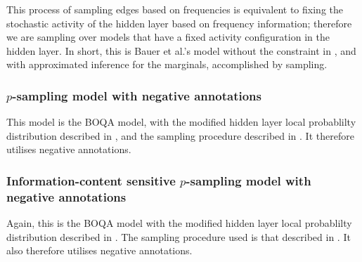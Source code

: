 This process of sampling edges based on frequencies is equivalent to
fixing the stochastic activity of the hidden layer based on
frequency information;
%
therefore we are sampling over models that have a fixed activity configuration in the
hidden layer.
%
In short, this is Bauer et al.'s model without the constraint in
, and with approximated inference for the
marginals, accomplished by sampling.

\subsubsection{$p$-sampling model with negative annotations}
\label{subsubsec:psampexp}
%
This model is the BOQA model, with the modified hidden layer local probablilty
distribution described in , and the sampling
procedure described in .
%
It therefore utilises negative annotations.

\subsubsection{Information-content sensitive $p$-sampling model with negative
annotations}
\label{subsubsec:icpsampexp}
%
Again, this is the BOQA model with the modified hidden layer local probablilty
distribution described in . The sampling
procedure used is that described in .
%
It also therefore utilises negative annotations.
